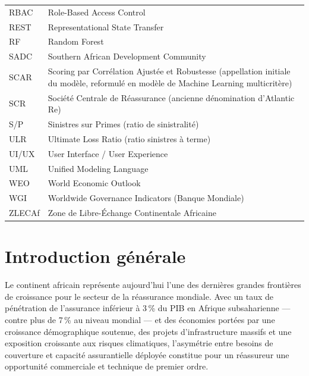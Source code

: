 \documentclass[12pt,a4paper]{report}
\begin{document}
\begin{center}
\begin{tabular}{@{}p{3cm}p{11.5cm}@{}}
RBAC    & Role-Based Access Control \\
REST    & Representational State Transfer \\
RF      & Random Forest \\
SADC    & Southern African Development Community \\
SCAR    & Scoring par Corrélation Ajustée et Robustesse (appellation initiale du modèle, reformulé en modèle de Machine Learning multicritère) \\
SCR     & Société Centrale de Réassurance (ancienne dénomination d'Atlantic Re) \\
S/P     & Sinistres sur Primes (ratio de sinistralité) \\
ULR     & Ultimate Loss Ratio (ratio sinistres à terme) \\
UI/UX   & User Interface / User Experience \\
UML     & Unified Modeling Language \\
WEO     & World Economic Outlook \\
WGI     & Worldwide Governance Indicators (Banque Mondiale) \\
ZLECAf  & Zone de Libre-Échange Continentale Africaine \\
\bottomrule
\end{tabular}
\end{center}
\clearpage

\setcounter{page}{1}

\chapter*{Introduction générale}

Le continent africain représente aujourd'hui l'une des dernières grandes frontières
de croissance pour le secteur de la réassurance mondiale. Avec un taux de pénétration
de l'assurance inférieur à 3\,\% du PIB en Afrique subsaharienne --- contre plus de
7\,\% au niveau mondial \citep{SwissRe2023} --- et des économies portées par une
croissance démographique soutenue, des projets d'infrastructure massifs et une
exposition croissante aux risques climatiques, l'asymétrie entre besoins de couverture
et capacité assurantielle déployée constitue pour un réassureur une opportunité
commerciale et technique de premier ordre.
\end{document}
